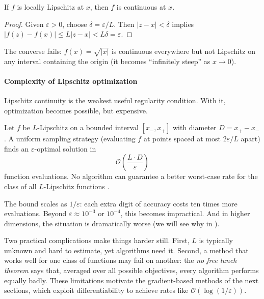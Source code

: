 \begin{theorem}\label{thm:lip-cont}
	If $f$ is locally Lipschitz at $x$, then $f$ is continuous at $x$.
\end{theorem}
\begin{proof}
	Given $\varepsilon > 0$, choose $\delta = \varepsilon / L$.
	Then $|z - x| < \delta$ implies $|f(z) - f(x)| \leq L |z - x| < L \delta = \varepsilon$.
\end{proof}

The converse fails: $f(x) = \sqrt{|x|}$ is continuous everywhere but not Lipschitz on any interval containing the origin (it becomes ``infinitely steep'' as $x \to 0$).

\paragraph{Complexity of Lipschitz optimization}

Lipschitz continuity is the weakest useful regularity condition.
With it, optimization becomes possible, but expensive.

\begin{theorem}\label{thm:lip-complexity}
	Let $f$ be $L$-Lipschitz on a bounded interval $[x_-, x_+]$ with diameter $D = x_+ - x_-$.
	A uniform sampling strategy (evaluating $f$ at points spaced at most $2\varepsilon/L$ apart) finds an $\varepsilon$-optimal solution in
	\begin{equation}\label{eq:lipschitz-complexity}
		\mathcal{O}\!\left(\frac{L\cdot D}{\varepsilon}\right)
	\end{equation}
	function evaluations.
	No algorithm can guarantee a better worst-case rate for the class of all $L$-Lipschitz functions \cite{hansen1995}.
\end{theorem}

The bound scales as $1/\varepsilon$: each extra digit of accuracy costs ten times more evaluations.
Beyond $\varepsilon \approx 10^{-3}$ or $10^{-4}$, this becomes impractical.
And in higher dimensions, the situation is dramatically worse (we will see why in ).

Two practical complications make things harder still.
First, $L$ is typically unknown and hard to estimate, yet algorithms need it.
Second, a method that works well for one class of functions may fail on another: the \emph{no free lunch theorem} \cite{serafino2014} says that, averaged over all possible objectives, every algorithm performs equally badly.
These limitations motivate the gradient-based methods of the next sections, which exploit differentiability to achieve rates like $\mathcal{O}(\log(1/\varepsilon))$.


